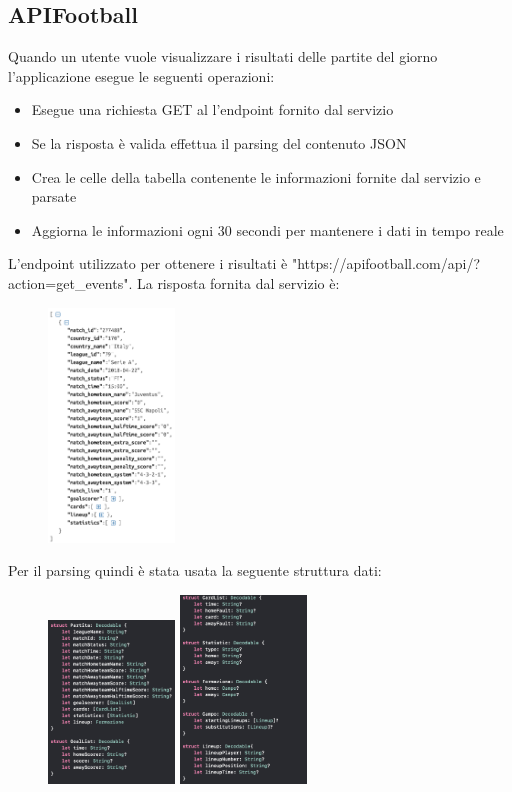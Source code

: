 \documentclass[numbers=noenddot, 12pt, a4paper, oneside]{scrbook}
\begin{document}
\subsection*{APIFootball}
Quando un utente vuole visualizzare i risultati delle partite del giorno l'applicazione esegue le seguenti operazioni:
\begin{itemize}
	\item Esegue una richiesta GET al l'endpoint fornito dal servizio
	\item Se la risposta è valida effettua il parsing del contenuto JSON
	\item Crea le celle della tabella contenente le informazioni fornite dal servizio e parsate
	\item Aggiorna le informazioni ogni 30 secondi per mantenere i dati in tempo reale
\end{itemize}
L'endpoint utilizzato per ottenere i risultati è "https://apifootball.com/api/?action=get\_events". La risposta fornita dal servizio è:
\begin{figure}[H]
	\centering
	\includegraphics[width=0.3\textwidth]{images/ResponseCompleta}
\end{figure}
Per il parsing quindi è stata usata la seguente struttura dati:
\begin{figure}[H]
	\centering
	\includegraphics[width=0.3\textwidth]{images/StructPartita2}
	\includegraphics[width=0.3\textwidth]{images/StructPartita1}
\end{figure}
\end{document}
